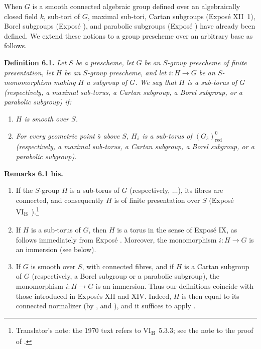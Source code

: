 

When \(G\) is a smooth connected algebraic group defined over an
algebraically closed field \(k\), sub-tori of \(G\), maximal
sub-tori, Cartan subgroups (Exposé XII~1), Borel subgroups (Exposé
), and parabolic subgroups (Exposé ) have already
been defined. We extend these notions to a group prescheme over an
arbitrary base as follows.

\textbf{Definition 6.1.} \emph{Let \(S\) be a prescheme, let \(G\)
be an \(S\)-group prescheme of finite presentation, let \(H\) be an
\(S\)-group prescheme, and let \(i:H\to G\) be an
\(S\)-monomorphism making \(H\) a subgroup of \(G\). We say that
\(H\) is a sub-torus of \(G\) (respectively, a maximal sub-torus, a
Cartan subgroup, a Borel subgroup, or a parabolic subgroup) if:}

\begin{enumerate}
\renewcommand{\labelenumi}{\textup{\roman{enumi})}}
\item
  \emph{\(H\) is smooth over \(S\).}
\item
  \emph{For every geometric point \(\bar s\) above \(S\),
  \(H_{\bar s}\) is a sub-torus of
  \((G_{\bar s})^{0}_{\mathrm{red}}\) (respectively, a maximal
  sub-torus, a Cartan subgroup, a Borel subgroup, or a parabolic
  subgroup).}
\end{enumerate}

\textbf{Remarks 6.1 bis.}

\begin{enumerate}
\renewcommand{\labelenumi}{\textup{\alph{enumi})}}
\item
  If the \(S\)-group \(H\) is a sub-torus of \(G\)
  (respectively, \(\ldots\)), its fibres are connected, and
  consequently \(H\) is of finite presentation over \(S\) (Exposé
  VI\textsubscript{B}~).\footnote{Translator's note: the 1970 text refers to VI\textsubscript{B}~5.3.3; see the note to the proof of .}
\item
  If \(H\) is a sub-torus of \(G\), then \(H\) is a torus in the
  sense of Exposé IX, as follows immediately from Exposé .
  Moreover, the monomorphism \(i:H\to G\) is an immersion (see 
  below).
\item
  If \(G\) is smooth over \(S\), with connected fibres, and if
  \(H\) is a Cartan subgroup of \(G\) (respectively, a Borel
  subgroup or a parabolic subgroup), the monomorphism \(i:H\to G\)
  is an immersion. Thus our definitions coincide with those
  introduced in Exposés XII and XIV. Indeed, \(H\) is then equal to
  its connected normalizer (by ,  and ),
  and it suffices to apply .
\end{enumerate}

